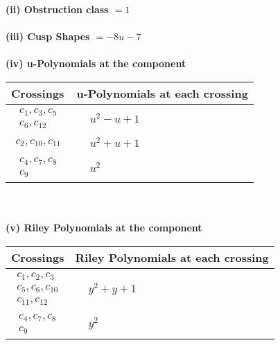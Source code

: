 \documentclass[1p]{elsarticle_modified}
\theoremstyle{definition}
\begin{document}
\flushleft \textbf{(ii) Obstruction class $= 1$}\\~\\
\flushleft \textbf{(iii) Cusp Shapes $= -8 u-7$}\\~\\
\newpage\renewcommand{\arraystretch}{1}
\flushleft \textbf{(iv) u-Polynomials at the component}\newline \\
\begin{tabular}{m{50pt}|m{274pt}}
Crossings & \hspace{64pt}u-Polynomials at each crossing \\
\hline $$\begin{aligned}c_{1},c_{3},c_{5}\\c_{6},c_{12}\end{aligned}$$&$\begin{aligned}
&u^2- u+1
\end{aligned}$\\
\hline $$\begin{aligned}c_{2},c_{10},c_{11}\end{aligned}$$&$\begin{aligned}
&u^2+u+1
\end{aligned}$\\
\hline $$\begin{aligned}c_{4},c_{7},c_{8}\\c_{9}\end{aligned}$$&$\begin{aligned}
&u^2
\end{aligned}$\\
\hline
\end{tabular}\\~\\
\newpage\renewcommand{\arraystretch}{1}
\flushleft \textbf{(v) Riley Polynomials at the component}\newline \\
\begin{tabular}{m{50pt}|m{274pt}}
Crossings & \hspace{64pt}Riley Polynomials at each crossing \\
\hline $$\begin{aligned}c_{1},c_{2},c_{3}\\c_{5},c_{6},c_{10}\\c_{11},c_{12}\end{aligned}$$&$\begin{aligned}
&y^2+y+1
\end{aligned}$\\
\hline $$\begin{aligned}c_{4},c_{7},c_{8}\\c_{9}\end{aligned}$$&$\begin{aligned}
&y^2
\end{aligned}$\\
\hline
\end{tabular}\\~\\
\end{document}
